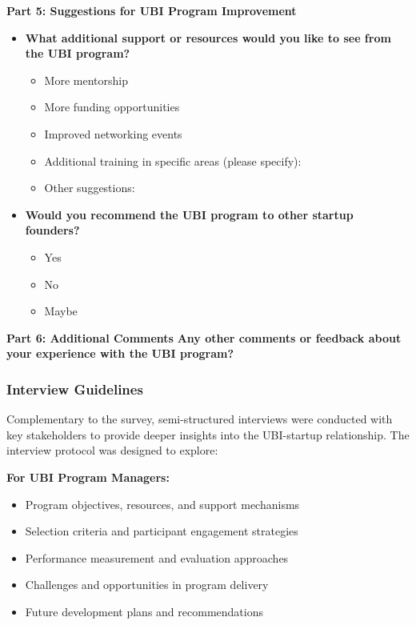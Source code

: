 \documentclass[../Main.tex]{subfiles}%
\begin{document}
	\textbf{Part 5: Suggestions for UBI Program Improvement}
	\begin{itemize}
		\item \textbf{What additional support or resources would you like to see from the UBI program?}
		\begin{itemize}
			\item More mentorship
			\item More funding opportunities
			\item Improved networking events
			\item Additional training in specific areas (please specify): \underline{\hspace{4cm}}
			\item Other suggestions: \underline{\hspace{4cm}}
		\end{itemize}
		\item \textbf{Would you recommend the UBI program to other startup founders?}
		\begin{itemize}
			\item Yes
			\item No
			\item Maybe
		\end{itemize}
	\end{itemize}
	
	\textbf{Part 6: Additional Comments}
	\textbf{Any other comments or feedback about your experience with the UBI program?}
	
	\underline{\hspace{12cm}}
	
	\underline{\hspace{12cm}}
	
	\underline{\hspace{12cm}}
	
	\subsubsection{Interview Guidelines}
	Complementary to the survey, semi-structured interviews were conducted with key stakeholders to provide deeper insights into the UBI-startup relationship. The interview protocol was designed to explore:
	
	\textbf{For UBI Program Managers:}
	\begin{itemize}
		\item Program objectives, resources, and support mechanisms
		\item Selection criteria and participant engagement strategies
		\item Performance measurement and evaluation approaches
		\item Challenges and opportunities in program delivery
		\item Future development plans and recommendations
	\end{itemize}
	
\end{document}
